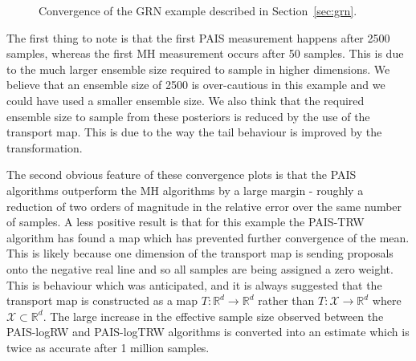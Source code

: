 \documentclass[final]{siamltex}
\begin{document}
\begin{figure}[!htb]
\centering
{}
\caption{Convergence of the GRN example described in Section~\ref{sec:grn}.}
\label{fig:grn_L2}
\end{figure}

The first thing to note is that the first PAIS measurement happens after 2500 samples, whereas the first MH measurement occurs after 50 samples. This is due to the much larger ensemble size required to sample in higher dimensions. We believe that an ensemble size of 2500 is over-cautious in this example and we could have used a smaller ensemble size. We also think that the required ensemble size to sample from these posteriors is reduced by the use of the transport map. This is due to the way the tail behaviour is improved by the transformation.

The second obvious feature of these convergence plots is that the PAIS algorithms outperform the MH algorithms by a large margin - roughly a reduction of two orders of magnitude in the relative error over the same number of samples. A less positive result is that for this example the PAIS-TRW algorithm has found a map which has prevented further convergence of the mean. This is likely because one dimension of the transport map is sending proposals onto the negative real line and so all samples are being assigned a zero weight. This is behaviour which was anticipated, and it is always suggested that the transport map is constructed as a map $T\colon\mathbb{R}^d\rightarrow\mathbb{R}^d$ rather than $T\colon\mathcal{X}\rightarrow\mathbb{R}^d$ where $\mathcal{X}\subset\mathbb{R}^d$. The large increase in the effective sample size observed between the PAIS-logRW and PAIS-logTRW algorithms is converted into an estimate which is twice as accurate after 1 million samples.
\end{document}
